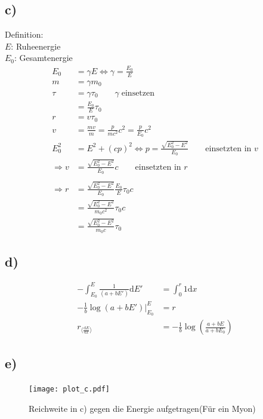 \subsection{c)}
    Definition:\\
    $E$: Ruheenergie\\
    $E_0$: Gesamtenergie
    \begin{align}
        E_0 &= \gamma E \Leftrightarrow \gamma = \frac{E_0}{E}\\
        m &= \gamma m_0\\
        \tau &= \gamma \tau_0 \qquad \gamma\; \text{einsetzen}\\
        &= \frac{E_0}{E} \tau_0\\
        r &= v\tau_0\\
        v &= \frac{mv}{m} = \frac{p}{mc^2}c^2 = \frac{p}{E_0}c^2\\
        E_0^2 &= E^2 + (cp)^2 \Leftrightarrow p = \frac{\sqrt{E_0^2-E^2}}{E_0} \qquad \text{einsetzten in $v$}\\
        \Rightarrow v &= \frac{\sqrt{E_0^2-E^2}}{E_0}c \qquad \text{einsetzten in $r$}\\
        \\
        \Rightarrow r &= \frac{\sqrt{E_0^2-E^2}}{E_0} \frac{E_0}{E} \tau_0 c\\
        &= \frac{\sqrt{E_0^2-E^2}}{m_0 c^2} \tau_0 c\\
        &= \frac{\sqrt{E_0^2-E^2}}{m_0 c} \tau_0
    \end{align}

\subsection{d)}

    \begin{align}
        -\int_{E_0}^{E} \frac{1}{(a+bE')} \mathrm{d}E' &= \int_{0}^{r} 1 \mathrm{d}x\\
        -\frac{1}{b}\log(a+bE')\vert_{E_0}^{E} &= r\\
        r_{\langle \frac{\mathrm{d}E}{\mathrm{d}x} \rangle} &= -\frac{1}{b}\log\left(\frac{a+bE}{a+bE_0}\right)
    \end{align}

\subsection{e)}


\begin{figure}[H]
    \centering
    \texttt{[image: plot\_c.pdf]}
    \caption{Reichweite in c) gegen die Energie aufgetragen(Für ein Myon)}
\end{figure}


